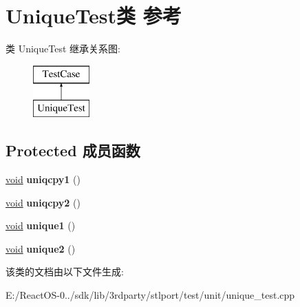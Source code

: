 \hypertarget{class_unique_test}{}\section{Unique\+Test类 参考}
\label{class_unique_test}
类 Unique\+Test 继承关系图\+:\begin{figure}[H]
\begin{center}
\leavevmode
\includegraphics[height=2.000000cm]{class_unique_test}
\end{center}
\end{figure}
\subsection*{Protected 成员函数}
\begin{DoxyCompactItemize}
\item 
\mbox{\label{class_unique_test_a989f3e0e7862284f169bab48ab372ab7}} 
\hyperlink{interfacevoid}{void} {\bfseries uniqcpy1} ()
\item 
\mbox{\label{class_unique_test_a9fdd93d4f50b064bba5f91984022fab1}} 
\hyperlink{interfacevoid}{void} {\bfseries uniqcpy2} ()
\item 
\mbox{\label{class_unique_test_a0fc9661812fea7c3e56d1ca17d0752dc}} 
\hyperlink{interfacevoid}{void} {\bfseries unique1} ()
\item 
\mbox{\label{class_unique_test_af5d4a501525a6e7d85680aa7d1fa1583}} 
\hyperlink{interfacevoid}{void} {\bfseries unique2} ()
\end{DoxyCompactItemize}


该类的文档由以下文件生成\+:\begin{DoxyCompactItemize}
\item 
E\+:/\+React\+O\+S-\/0../sdk/lib/3rdparty/stlport/test/unit/unique\+\_\+test.\+cpp\end{DoxyCompactItemize}
